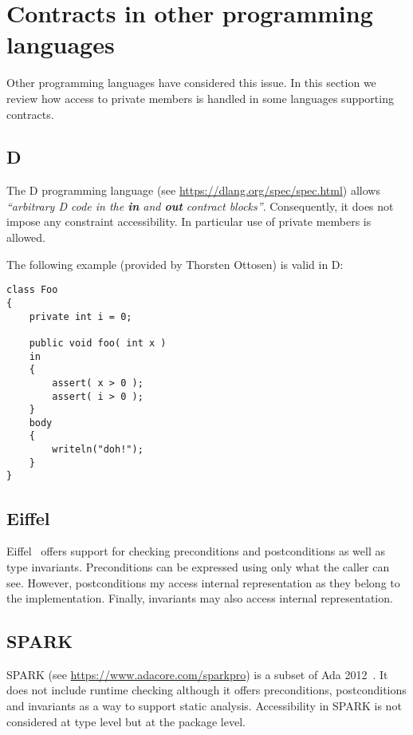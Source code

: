 \section{Contracts in other programming languages}

Other programming languages have considered this issue. 
In this section we review how access to private members is handled
in some languages supporting contracts.

\subsection{D}

The D programming language (see \url{https://dlang.org/spec/spec.html}) allows
\emph{``arbitrary D code in the \textbf{in} and \textbf{out} contract
blocks''}. Consequently, it does not impose any constraint accessibility. In
particular use of private members is allowed.

The following example (provided by Thorsten Ottosen) is valid in D:

\begin{lstlisting}[morekeywords={in,body}]
class Foo
{
    private int i = 0;
    
    public void foo( int x ) 
    in
    {
        assert( x > 0 );
        assert( i > 0 );
    }
    body
    {
        writeln("doh!"); 
    }
}
\end{lstlisting}

\subsection{Eiffel}

Eiffel~\cite{iso-eiffel,ecma-eiffel} offers support for checking preconditions
and postconditions as well as type invariants. Preconditions can be expressed
using only what the caller can see. However, postconditions my access internal
representation as they belong to the implementation. Finally, invariants may
also access internal representation.

\subsection{SPARK}

SPARK (see \url{https://www.adacore.com/sparkpro}) is a subset of Ada
2012~\cite{Ada2012}. It does not include runtime checking although it offers
preconditions, postconditions and invariants as a way to support static
analysis. Accessibility in SPARK is not considered at type level but at the
package level.


